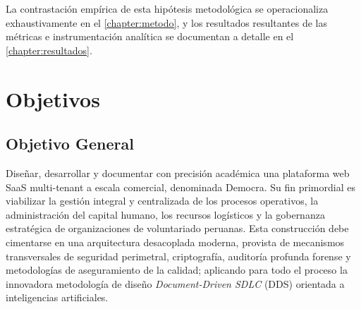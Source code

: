\documentclass[11pt,a4paper,oneside]{report}
\begin{document}
La contrastaci\'on emp\'irica de esta hip\'otesis metodol\'ogica se operacionaliza exhaustivamente en el \autoref{chapter:metodo}, y los resultados resultantes de las m\'etricas e instrumentaci\'on anal\'itica se documentan a detalle en el \autoref{chapter:resultados}.

\section{Objetivos}
\subsection{Objetivo General}
Dise\~nar, desarrollar y documentar con precisi\'on acad\'emica una plataforma web SaaS multi-tenant a escala comercial, denominada Democra. Su fin primordial es viabilizar la gesti\'on integral y centralizada de los procesos operativos, la administraci\'on del capital humano, los recursos log\'isticos y la gobernanza estrat\'egica de organizaciones de voluntariado peruanas. Esta construcci\'on debe cimentarse en una arquitectura desacoplada moderna, provista de mecanismos transversales de seguridad perimetral, criptograf\'ia, auditor\'ia profunda forense y metodolog\'ias de aseguramiento de la calidad; aplicando para todo el proceso la innovadora metodolog\'ia de dise\~no \textit{Document-Driven SDLC} (DDS) orientada a inteligencias artificiales.
\end{document}
